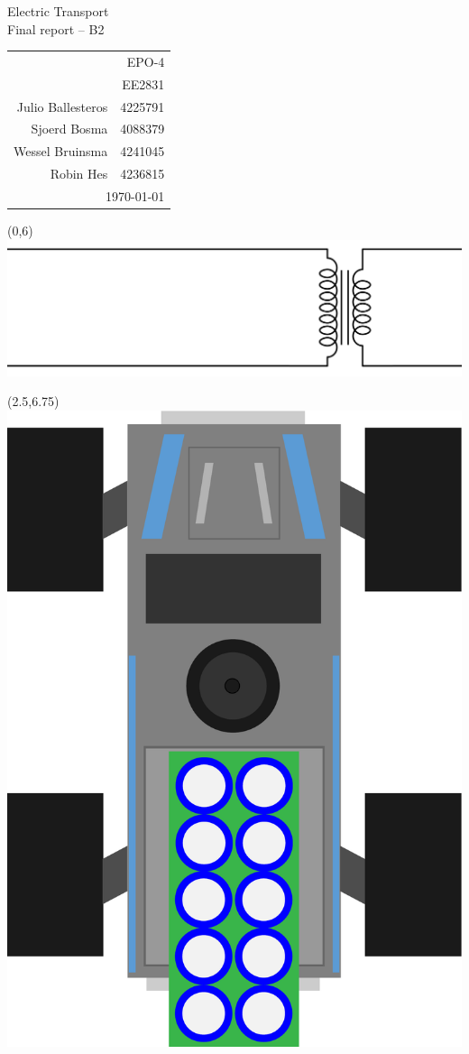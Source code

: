 \documentclass[11pt,titlepage]{report}
\begin{document}
\begin{titlepage}

 \BgThispage

\newlength{\drop}

\begingroup
	\sffamily

	\textheight
	\vspace*{\drop}
	\begin{flushright}
		{\fontsize{1.8cm}{1em} \selectfont \color{white} Electric Transport} \\
		\vspace*{52pt}
		{\fontsize{0.8cm}{1em} \selectfont Final report -- B2}

		\vfill

		{\fontsize{0.5cm}{1em} \selectfont
			\normalfont
			
			\begin{tabular}{rr}
				\multicolumn{2}{r}{EPO-4} \\[0.5em]
				\multicolumn{2}{r}{EE2831} \\[1.5em]
				Julio Ballesteros & 4225791 \\[0.5em]
				Sjoerd Bosma & 4088379 \\[0.5em]
				Wessel Bruinsma & 4241045 \\[0.5em]
				Robin Hes & 4236815 \\[1.5em]
				\multicolumn{2}{r}{\today} \\
			\end{tabular}
			
		}
	\end{flushright}
\endgroup

\begin{textblock}{16.1}(0,6)
	\includegraphics[width=\linewidth]{resource/title.png}
\end{textblock}

\begin{textblock}{16.1}(2.5,6.75)
	\includegraphics[width=0.175\linewidth,angle=270]{resource/kitt.pdf}
\end{textblock}

\end{titlepage}
\end{document}
